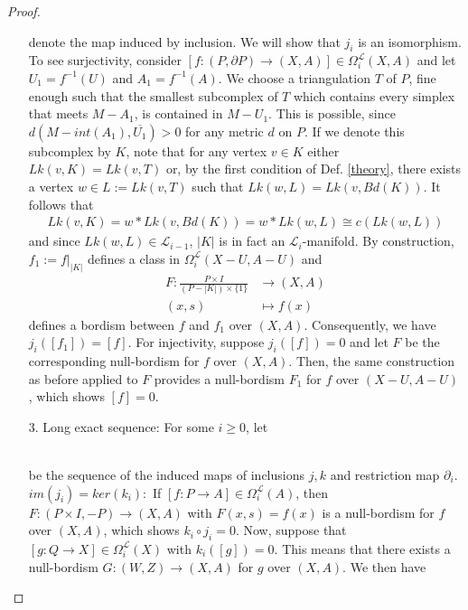 \documentclass[11pt]{book}
\begin{document}
\begin{proof}
\begin{itemize}
\begin{equation*}
\end{equation*}
denote the map induced by inclusion. We will show that $j_i$ is an isomorphism. To see surjectivity, consider $[f: (P, \partial P) \to (X,A)] \in \Omega_i^{\mathcal{L}}(X,A)$ and let $U_1 = f^{-1}(U)$ and $A_1= f^{-1}(A)$. We choose a triangulation $T$ of $P$, fine enough such that the smallest subcomplex of $T$ which contains every simplex that meets $M-A_1$, is contained in $M-U_1$. This is possible, since $d(M-int(A_1), \overline{U_1})>0$ for any metric $d$ on $P$. If we denote this subcomplex by $K$, note that for any vertex $v \in K$ either $Lk(v,K)=Lk(v,T)$ or, by the first condition of Def. \ref{theory}, there exists a vertex $w \in L:= Lk(v,T)$ such that $Lk(w,L)=Lk(v,Bd(K))$. It follows that
\begin{align*}
Lk(v,K) = w * Lk(v,Bd(K)) = w * Lk(w,L) \cong c(Lk(w,L))
\end{align*}
and since $Lk(w,L) \in \mathcal{L}_{i-1}$, $|K|$ is in fact an $\mathcal{L}_i$-manifold. By construction, $f_1:=f|_{|K|}$ defines a class in $\Omega_i^{\mathcal{L}}(X-U,A-U)$ and 
\begin{align*}
F: \frac{P \times I}{ (P-|K|) \times \{ 1 \} } &\to (X,A) \\
(x,s) &\mapsto f(x)
\end{align*}
defines a bordism between $f$ and $f_1$ over $(X,A)$. Consequently, we have $j_i ([f_1]) = [f]$. For injectivity, suppose $j_i([f])=0$ and let $F$ be the corresponding null-bordism for $f$ over $(X,A)$. Then, the same construction as before applied to $F$ provides a null-bordism $F_1$ for $f$ over $(X-U,A-U)$, which shows $[f]=0$.
\item[3.] Long exact sequence: For some $i \geq 0$, let \\
\\
be the sequence of the induced maps of inclusions $j,k$ and restriction map $\partial_i$. \\
{$im(j_i) = ker(k_i):$} If $[f:P \to A] \in \Omega_i^{\mathcal{L}}(A)$, then $F: (P \times I, -P) \to (X,A)$ with $F(x,s)=f(x)$ is a null-bordism for $f$ over $(X,A)$, which shows $k_i \circ j_i = 0$. Now, suppose that $[g: Q \to X] \in \Omega_i^{\mathcal{L}}(X)$ with $k_i([g])=0$. This means that there exists a null-bordism $G: (W,Z) \to (X,A)$ for $g$ over $(X,A)$. We then have 

\end{itemize}
\end{proof}
\end{document}
